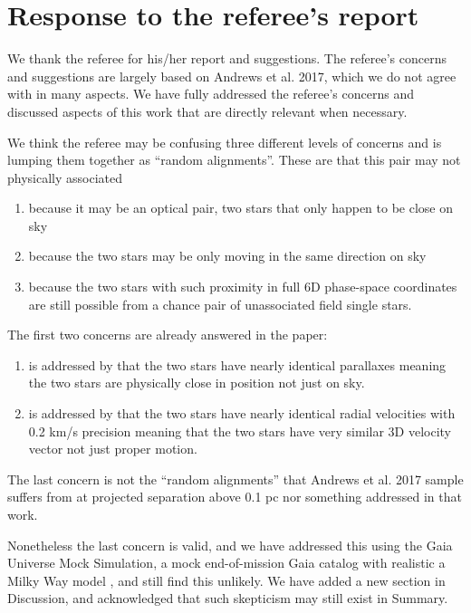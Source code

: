 \documentclass[12pt]{article}
\begin{document}
\section*{Response to the referee's report}
\label{response-to-the-referees-report}

We thank the referee for his/her report and suggestions. The referee's
concerns and suggestions are largely based on Andrews et al. 2017, which
we do not agree with in many aspects. We have fully addressed the
referee's concerns and discussed aspects of this work that are directly
relevant when necessary.

We think the referee may be confusing three different levels of concerns
and is lumping them together as ``random alignments''. These are that
this pair may not physically associated

\begin{enumerate}
\def\labelenumi{\arabic{enumi}.}
\itemsep1pt\parskip0pt
\item
  because it may be an optical pair, two stars that only happen to be
  close on sky
\item
  because the two stars may be only moving in the same direction on sky
\item
  because the two stars with such proximity in full 6D phase-space
  coordinates are still possible from a chance pair of unassociated
  field single stars.
\end{enumerate}

The first two concerns are already answered in the paper:

\begin{enumerate}
\def\labelenumi{\arabic{enumi}.}
\itemsep1pt\parskip0pt
\item
  is addressed by that the two stars have nearly identical parallaxes
  meaning the two stars are physically close in position not just on
  sky.
\item
  is addressed by that the two stars have nearly identical radial
  velocities with 0.2 km/s precision meaning that the two stars have
  very similar 3D velocity vector not just proper motion.
\end{enumerate}

The last concern is not the ``random alignments'' that Andrews et al.
2017 sample suffers from at projected separation above 0.1 pc nor
something addressed in that work.

Nonetheless the last concern is valid, and we have addressed this using the Gaia
Universe Mock Simulation, a mock end-of-mission Gaia catalog with realistic a
Milky Way model \citep{gums}, and still find this unlikely. We have added a new
section in Discussion, and acknowledged that such skepticism may still exist in
Summary.
\end{document}
